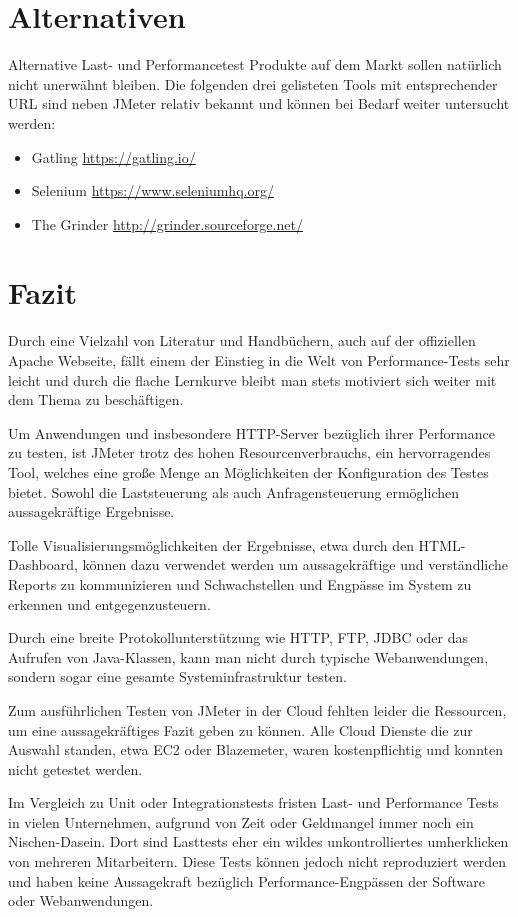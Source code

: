 \documentclass[a4paper,12pt]{article}
\begin{document}
\section{Alternativen}
Alternative  Last- und Performancetest Produkte auf dem Markt sollen natürlich nicht unerwähnt bleiben. Die folgenden drei gelisteten Tools mit entsprechender URL sind neben JMeter relativ bekannt und können bei Bedarf weiter untersucht werden: 
\begin{itemize}
	\item Gatling \url{https://gatling.io/}
	\item Selenium \url{https://www.seleniumhq.org/}
	\item The Grinder \url{http://grinder.sourceforge.net/}
\end{itemize}

\section{Fazit}
Durch eine Vielzahl von Literatur und Handbüchern, auch auf der offiziellen Apache Webseite, fällt einem der Einstieg in die Welt von Performance-Tests sehr leicht und durch die flache Lernkurve bleibt man stets motiviert sich weiter mit dem Thema zu beschäftigen.

Um Anwendungen und insbesondere HTTP-Server bezüglich ihrer Performance zu testen, ist JMeter trotz des hohen Resourcenverbrauchs, ein hervorragendes Tool, welches eine große Menge an Möglichkeiten der Konfiguration des Testes bietet. Sowohl die Laststeuerung als auch Anfragensteuerung ermöglichen aussagekräftige Ergebnisse.

Tolle Visualisierungsmöglichkeiten der Ergebnisse, etwa durch den HTML-Dashboard, können dazu verwendet werden um aussagekräftige und verständliche Reports zu kommunizieren und Schwachstellen und Engpässe im System zu erkennen und entgegenzusteuern.

Durch eine breite Protokollunterstützung wie HTTP, FTP, JDBC oder das Aufrufen von Java-Klassen, kann man nicht durch typische Webanwendungen, sondern sogar eine gesamte Systeminfrastruktur testen.

Zum ausführlichen Testen von JMeter in der Cloud fehlten leider die Ressourcen, um eine aussagekräftiges Fazit geben zu können. Alle Cloud Dienste die zur Auswahl standen, etwa EC2 oder Blazemeter, waren kostenpflichtig und konnten nicht getestet werden.

Im Vergleich zu Unit oder Integrationstests fristen Last- und Performance Tests in vielen Unternehmen, aufgrund von Zeit oder Geldmangel immer noch ein Nischen-Dasein. Dort sind Lasttests eher ein wildes unkontrolliertes umherklicken von mehreren Mitarbeitern. Diese Tests können jedoch nicht reproduziert werden und haben keine Aussagekraft bezüglich Performance-Engpässen der Software oder Webanwendungen. 
\end{document}

